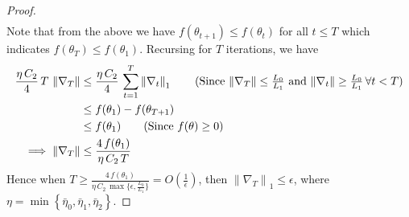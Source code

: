 \documentclass{article}
\newcommand{\norm}[1]{\left\|#1 \right\|}
\newcommand{\tht}{\theta_t}
\newcommand{\thtt}{\theta_{t+1}}
\begin{document}
\begin{proof}
\begin{align}
\end{align}
Note that from the above we have $f(\thtt) \leq f(\tht)$ for all $t \leq T $ which indicates $f(\theta_{T}) \leq f(\theta_1)$. Recursing for $T$ iterations, we have 
\begin{align*}
    \frac{\eta \, C_2}{4}\, T \, \norm{\nabla_{T}} &\leq \frac{\eta \, C_2}{4} \, \sum_{t=1}^{T} \norm{\nabla_t}_1 \tag{Since $\norm{\nabla_{T}} \leq \frac{L_0}{L_1}$ and $\norm{\nabla_{t}} \geq \frac{L_0}{L_1} \, \forall t < T$}\\ 
    &\leq f(\theta_1)- f(\theta_{T + 1}) \\ 
    & \leq f(\theta_1) \tag{Since $f(\theta) \geq 0$}\\
    \implies \norm{\nabla_{T}} & \leq \frac{4 \, f(\theta_1)}{\eta \, C_2 \, T} 
\end{align*}
Hence when $T \geq \frac{4 \, f(\theta_1) }{\eta \, C_2\, \max \{\epsilon, \frac{L_0}{L_1}\}} =  O(\frac{1}{\epsilon})$, then $\norm{\nabla_{T}}_1 \leq \epsilon$, where $\eta = \min \left\{\bar{\eta}_0, \bar{\eta}_1, \bar{\eta}_2 \right\}$. 


\end{proof}
\end{document}
